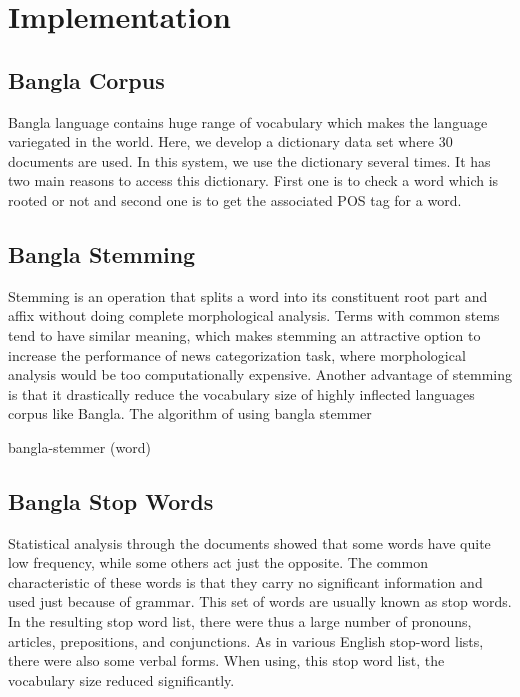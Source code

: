 \chapter{Implementation}
\label{Ch_Chapter4}

\section{Bangla Corpus}

Bangla language contains huge range of vocabulary which makes the language variegated in the world. Here, we develop a dictionary data set where 30 documents are used. In this system, we use the dictionary several times. It has two main reasons to access this dictionary.  First one is to check a word which is rooted or not and second one is to get the associated POS tag for a word.

\section{Bangla Stemming}

Stemming is an operation that splits a word into its constituent root part and affix without doing complete morphological analysis. Terms with common stems tend to have similar meaning, which makes stemming an attractive option to increase the performance of news categorization task, where morphological analysis would be too computationally expensive. Another advantage of stemming is that it drastically reduce the vocabulary size of highly inflected languages corpus like Bangla.
The algorithm of using bangla stemmer


\begin{algorithm}[H]
 
 \caption{bangla-stemmer (word)}

\end{algorithm}


\section{Bangla Stop Words}

Statistical analysis through the documents showed that some words have quite low frequency, while some others act just the opposite. The common characteristic of these words is that they carry no significant information and used just because of grammar. This set of words are usually known as stop words.  In the resulting stop word list, there were thus a large number of pronouns, articles, prepositions, and conjunctions. As in various English stop-word lists, there
were also some verbal forms. When using, this stop word list, the vocabulary size reduced significantly.


